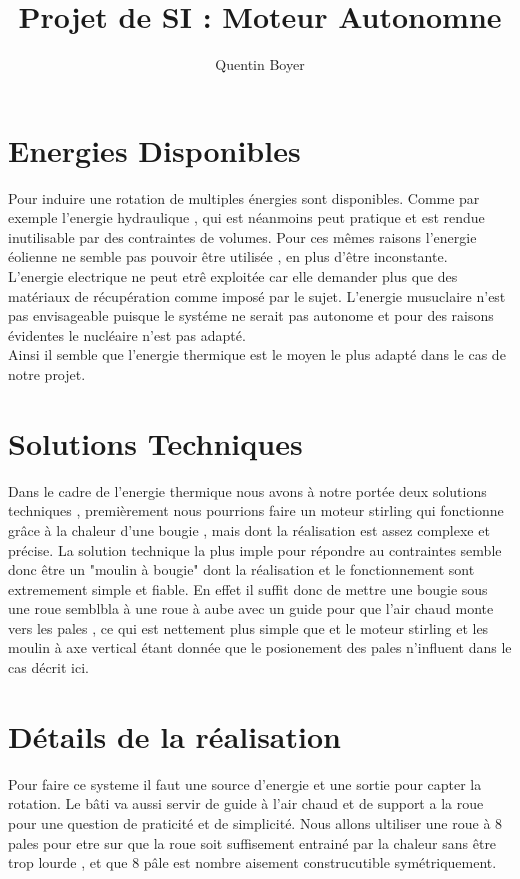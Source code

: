 \documentclass[a4paper,12pt]{article}
\title{Projet de SI : Moteur Autonomne}
\author{Quentin Boyer}
\begin{document}
\maketitle
\tableofcontents

\section{Energies Disponibles}

\indent  Pour induire une rotation de multiples énergies sont disponibles. Comme par exemple l'energie hydraulique , qui est néanmoins peut pratique et est rendue inutilisable par des contraintes de volumes. Pour ces mêmes raisons l'energie éolienne ne semble pas pouvoir être utilisée , en plus d'être inconstante.\\[0.3cm]
\indent  L'energie electrique ne peut etrê exploitée car elle demander plus que des matériaux de récupération comme imposé par le sujet. L'energie musuclaire n'est pas envisageable puisque le systéme ne serait pas autonome et pour des raisons évidentes le nucléaire n'est pas adapté.\\[0.3cm]
\indent  Ainsi il semble que l'energie thermique est le moyen le plus adapté dans le cas de notre projet.\\[0.05cm]

\pagebreak

\section{Solutions Techniques}
  Dans le cadre de l'energie thermique nous avons à notre portée deux solutions techniques , premièrement nous pourrions faire un moteur stirling qui fonctionne grâce à la chaleur d'une bougie , mais dont la réalisation est assez complexe et précise. La solution technique la plus imple pour répondre au contraintes semble donc être un "moulin à bougie" dont la réalisation et le fonctionnement sont extremement simple et fiable. En effet il suffit donc de mettre une bougie sous une roue semblbla à une roue à aube avec un guide pour que l'air chaud monte vers les pales , ce qui est nettement plus simple que et le moteur stirling et les moulin à axe vertical étant donnée que le posionement des pales n'influent dans le cas décrit ici.
  
\section{Détails de la réalisation}
  Pour faire ce systeme il faut une source d'energie et une sortie pour capter la rotation. Le bâti va aussi servir de guide à l'air chaud et de support a la roue pour une question de praticité et de simplicité. Nous allons ultiliser une roue à 8 pales pour etre sur que la roue soit suffisement entrainé par la chaleur sans être trop lourde , et que 8 pâle est nombre aisement construcutible symétriquement.
\end{document}

